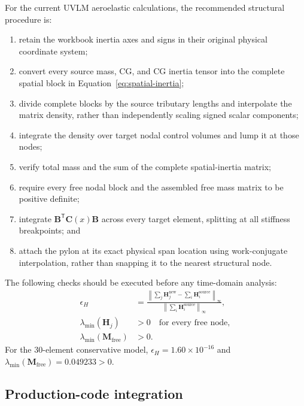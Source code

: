 \documentclass[11pt,a4paper]{article}
\newcommand{\mat}[1]{\bm{#1}}
\begin{document}
For the current UVLM aeroelastic calculations, the recommended structural
procedure is:
\begin{enumerate}
  \item retain the workbook inertia axes and signs in their original physical
        coordinate system;
  \item convert every source mass, CG, and CG inertia tensor into the complete
        spatial block in Equation~\eqref{eq:spatial-inertia};
  \item divide complete blocks by the source tributary lengths and interpolate
        the matrix density, rather than independently scaling signed scalar
        components;
  \item integrate the density over target nodal control volumes and lump it at
        those nodes;
  \item verify total mass and the sum of the complete spatial-inertia matrix;
  \item require every free nodal block and the assembled free mass matrix to
        be positive definite;
  \item integrate \(\mat B^{\mathsf T}\mat C(x)\mat B\) across every target
        element, splitting at all stiffness breakpoints; and
  \item attach the pylon at its exact physical span location using
        work-conjugate interpolation, rather than snapping it to the nearest
        structural node.
\end{enumerate}

The following checks should be executed before any time-domain analysis:
\begin{align}
\epsilon_H &=
\frac{\left\|\sum_j\mat H_j^{\mathrm{new}}
-\sum_i\mat H_i^{\mathrm{source}}\right\|_\infty}
{\left\|\sum_i\mat H_i^{\mathrm{source}}\right\|_\infty},\\
\lambda_{\min}(\mat H_j) &> 0
\quad\text{for every free node},\\
\lambda_{\min}(\mat M_{\mathrm{free}}) &> 0.
\end{align}
For the 30-element conservative model,
\(\epsilon_H=1.60\times10^{-16}\) and
\(\lambda_{\min}(\mat M_{\mathrm{free}})=0.049233>0\).

\subsection{Production-code integration}
\end{document}
